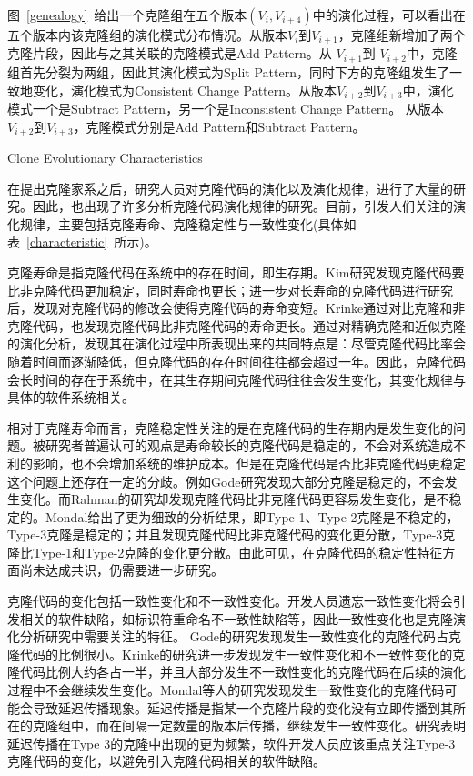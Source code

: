 图~\ref{genealogy}~给出一个克隆组在五个版本$(V_i, V_{i+4})$中的演化过程，可以看出在五个版本内该克隆组的演化模式分布情况。从版本$V_i$到$V_{i+1}$，克隆组新增加了两个克隆片段，因此与之其关联的克隆模式是Add Pattern。从 $V_{i+1}$到 $V_{i+2}$中，克隆组首先分裂为两组，因此其演化模式为Split Pattern，同时下方的克隆组发生了一致地变化，演化模式为Consistent Change Pattern。从版本$V_{i+2}$到$V_{i+3}$中，演化模式一个是Subtract Pattern，另一个是Inconsistent Change Pattern。 从版本$V_{i+2}$到$V_{i+3}$，克隆模式分别是Add Pattern和Subtract Pattern。

{Clone Evolutionary Characteristics}

在提出克隆家系之后，研究人员对克隆代码的演化以及演化规律，进行了大量的研究。因此，也出现了许多分析克隆代码演化规律的研究。目前，引发人们关注的演化规律，主要包括克隆寿命、克隆稳定性与一致性变化(具体如表~\ref{characteristic}~所示)。

克隆寿命是指克隆代码在系统中的存在时间，即生存期。Kim研究发现克隆代码要比非克隆代码更加稳定，同时寿命也更长\cite{kim2005empirical}；进一步对长寿命的克隆代码进行研究后，发现对克隆代码的修改会使得克隆代码的寿命变短\cite{cai2011empirical}。Krinke通过对比克隆和非克隆代码，也发现克隆代码比非克隆代码的寿命更长\cite{krinke2011cloned}。通过对精确克隆和近似克隆的演化分析，发现其在演化过程中所表现出来的共同特点是：尽管克隆代码比率会随着时间而逐渐降低，但克隆代码的存在时间往往都会超过一年\cite{bazrafshan2012evolution}。因此，克隆代码会长时间的存在于系统中，在其生存期间克隆代码往往会发生变化，其变化规律与具体的软件系统相关\cite{gode2009evolution}。

相对于克隆寿命而言，克隆稳定性关注的是在克隆代码的生存期内是发生变化的问题。被研究者普遍认可的观点是寿命较长的克隆代码是稳定的\cite{krinke2008cloned}\cite{gode2011clone}\cite{harder2013cloned}，不会对系统造成不利的影响，也不会增加系统的维护成本。但是在克隆代码是否比非克隆代码更稳定这个问题上还存在一定的分歧。例如Gode研究发现大部分克隆是稳定的，不会发生变化\cite{gode2011frequency}。而Rahman的研究却发现克隆代码比非克隆代码更容易发生变化，是不稳定的\cite{rahman2014change}。Mondal给出了更为细致的分析结果，即Type-1、Type-2克隆是不稳定的，Type-3克隆是稳定的；并且发现克隆代码比非克隆代码的变化更分散，Type-3克隆比Type-1和Type-2克隆的变化更分散\cite{mondal2012comparative}\cite{mondal2012dispersion}。由此可见，在克隆代码的稳定性特征方面尚未达成共识，仍需要进一步研究。

克隆代码的变化包括一致性变化和不一致性变化。开发人员遗忘一致性变化将会引发相关的软件缺陷，如标识符重命名不一致性缺陷等，因此一致性变化也是克隆演化分析研究中需要关注的特征。 Gode的研究发现发生一致性变化的克隆代码占克隆代码的比例很小\cite{gode2011frequency}。Krinke的研究进一步发现发生一致性变化和不一致性变化的克隆代码比例大约各占一半，并且大部分发生不一致性变化的克隆代码在后续的演化过程中不会继续发生变化\cite{krinke2007study}。Mondal等人的研究发现发生一致性变化的克隆代码可能会导致延迟传播现象。延迟传播是指某一个克隆片段的变化没有立即传播到其所在的克隆组中，而在间隔一定数量的版本后传播，继续发生一致性变化。研究表明延迟传播在Type 3的克隆中出现的更为频繁，软件开发人员应该重点关注Type-3克隆代码的变化，以避免引入克隆代码相关的软件缺陷\cite{mondal2016comparative}。

